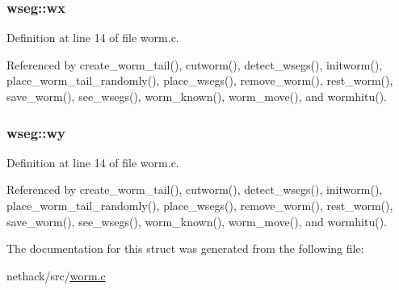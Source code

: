 \hypertarget{structwseg_abb5c94582c1ae01368b39d77126cafa1}{
\subsubsection[{wx}]{ wseg\+::wx}}\label{structwseg_abb5c94582c1ae01368b39d77126cafa1}


Definition at line 14 of file worm.\+c.



Referenced by create\+\_\+worm\+\_\+tail(), cutworm(), detect\+\_\+wsegs(), initworm(), place\+\_\+worm\+\_\+tail\+\_\+randomly(), place\+\_\+wsegs(), remove\+\_\+worm(), rest\+\_\+worm(), save\+\_\+worm(), see\+\_\+wsegs(), worm\+\_\+known(), worm\+\_\+move(), and wormhitu().

\hypertarget{structwseg_a5f5c26867c4c0aa0ab85e11fdfc93945}{
\subsubsection[{wy}]{ wseg\+::wy}}\label{structwseg_a5f5c26867c4c0aa0ab85e11fdfc93945}


Definition at line 14 of file worm.\+c.



Referenced by create\+\_\+worm\+\_\+tail(), cutworm(), detect\+\_\+wsegs(), initworm(), place\+\_\+worm\+\_\+tail\+\_\+randomly(), place\+\_\+wsegs(), remove\+\_\+worm(), rest\+\_\+worm(), save\+\_\+worm(), see\+\_\+wsegs(), worm\+\_\+known(), worm\+\_\+move(), and wormhitu().



The documentation for this struct was generated from the following file\+:\begin{DoxyCompactItemize}
\item 
nethack/src/\hyperlink{worm_8c}{worm.\+c}\end{DoxyCompactItemize}

